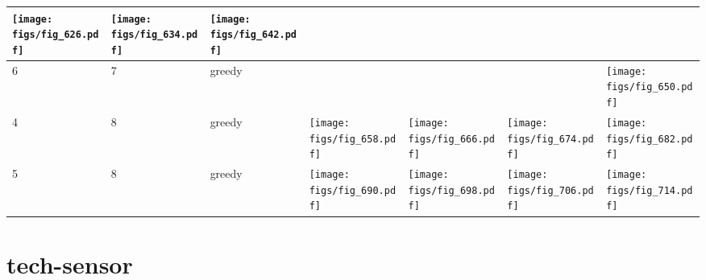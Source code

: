 \documentclass[oneside,canadian,landscape]{article}
\begin{document}
\begin{center}
\begin{longtable}{|l|l|l||l|l|l|l|}
\begin{minipage}{3.5cm}
\texttt{[image: figs/fig\_626.pdf]}
\end{minipage}
&\begin{minipage}{3.5cm}
\texttt{[image: figs/fig\_634.pdf]}
\end{minipage}
&\begin{minipage}{3.5cm}
\texttt{[image: figs/fig\_642.pdf]}
\end{minipage}
\\ \hline
6&7&greedy&&&&\begin{minipage}{3.5cm}
\texttt{[image: figs/fig\_650.pdf]}
\end{minipage}
\\ \hline
4&8&greedy&\begin{minipage}{3.5cm}
\texttt{[image: figs/fig\_658.pdf]}
\end{minipage}
&\begin{minipage}{3.5cm}
\texttt{[image: figs/fig\_666.pdf]}
\end{minipage}
&\begin{minipage}{3.5cm}
\texttt{[image: figs/fig\_674.pdf]}
\end{minipage}
&\begin{minipage}{3.5cm}
\texttt{[image: figs/fig\_682.pdf]}
\end{minipage}
\\ \hline
5&8&greedy&\begin{minipage}{3.5cm}
\texttt{[image: figs/fig\_690.pdf]}
\end{minipage}
&\begin{minipage}{3.5cm}
\texttt{[image: figs/fig\_698.pdf]}
\end{minipage}
&\begin{minipage}{3.5cm}
\texttt{[image: figs/fig\_706.pdf]}
\end{minipage}
&\begin{minipage}{3.5cm}
\texttt{[image: figs/fig\_714.pdf]}
\end{minipage}
\\ \hline
\end{longtable}
\end{center}
\section{tech-sensor}
\end{document}
